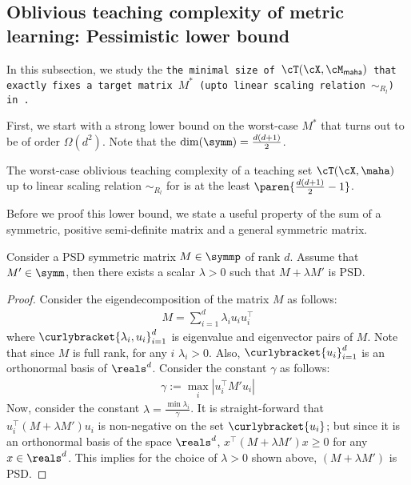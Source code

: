 
\subsection{Oblivious teaching complexity of metric learning: Pessimistic lower bound}

In this subsection, we study the \tt{the minimal size of $\cT(\cX,\cM_{\textsf{maha}})$ that exactly fixes a target matrix $M^*$ (upto linear scaling relation $\sim_{R_l}$) in }.

First, we start with a strong lower bound on the worst-case $M^*$ that turns out to be of order $\Omega(d^2)$. Note that the $\dim(\symm) = \frac{d(d+1)}{2}$.


\begin{proposition}\label{prop: worstcase} The worst-case oblivious teaching complexity of a teaching set $\cT(\cX, \maha)$ up to linear scaling relation $\sim_{R_l}$ for  is at the least $\paren{\frac{d(d+1)}{2} - 1}$.
\end{proposition}

Before we proof this lower bound, we state a useful property of the sum of a symmetric, positive semi-definite matrix and a general symmetric matrix.
\begin{lemma}\label{lem: sum}
    Consider a PSD symmetric matrix $M \in \symmp$ of rank $d$. Assume that $M' \in \symm$, then there exists a scalar $\lambda > 0$ such that $M + \lambda M'$ is
    PSD.
\end{lemma}
\begin{proof}
    Consider the eigendecomposition of the matrix $M$ as follows:
    \begin{align*}
        M = \sum_{i=1}^d \lambda_i u_iu_i^{\top}%
    \end{align*}
    where $\curlybracket{\lambda_i,u_i}_{i=1}^d$ is eigenvalue and eigenvector pairs of $M$. Note that since $M$ is full rank, for any $i$ $\lambda_i > 0$. Also, $\curlybracket{u_i}_{i=1}^d$ is an orthonormal basis of $\reals^d$.
    Consider the constant $\gamma$ as follows:
    \begin{align*}
        \gamma := \max_i |u_i^{\top}M'u_i| 
    \end{align*}
    Now, consider the constant $\lambda = \frac{\min \lambda_i}{\gamma}$. It is straight-forward that $u_i^{\top}(M + \lambda M')u_i$ is non-negative on the set $\curlybracket{u_i}$; but since it is an orthonormal basis of the space $\reals^d$, $x^{\top}(M + \lambda M')x \ge 0$ for any $x \in \reals^d$. This implies for the choice of $\lambda > 0$ shown above, $(M + \lambda M')$ is PSD.
\end{proof}

